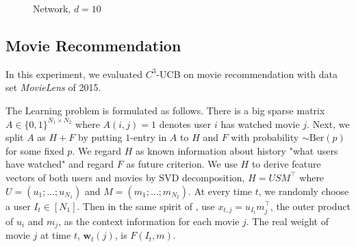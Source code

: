 \documentclass{article}
\newcommand{\bw}{\mathbf{w}}
\begin{document}
\begin{figure}
	\centering
	\caption{Network, $d=10$}
	\label{fig:network} %
\end{figure}

\subsection{Movie Recommendation}

In this experiment, we evaluated $C^3$-UCB on movie recommendation with data set {\it MovieLens} \cite{lam2013movie} of 2015.

The Learning problem is formulated as follows. There is a big sparse matrix $A \in \{0,1\}^{N_1 \times N_2}$ where $A(i,j) = 1$ denotes user $i$ has watched movie $j$. Next, we split $A$ as $H + F$ by putting $1$-entry in $A$ to $H$ and $F$ with probability $\sim \mathrm{Ber}(p)$ for some fixed $p$. We regard $H$ as known information about history "what users have watched" and regard $F$ as future criterion. We use $H$ to derive feature vectors of both users and movies by SVD decomposition, $H = USM^{\top}$ where $U = (u_1; ...;u_{N_1})$ and $M = (m_1;...;m_{N_2})$. At every time $t$, we randomly choose a user $I_t \in [N_1]$. Then in the same spirit of \cite{li2010contextual}, use $x_{t,j} = u_{I_t}m_j^{\top}$, the outer product of $u_{i}$ and $m_{j}$, as the context information for each movie $j$. The real weight of movie $j$ at time $t$, $\bw_t(j)$, is $F(I_t,m)$.
\end{document}
